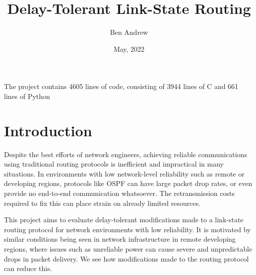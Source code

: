 \documentclass[withindex,glossary,openany]{cam-thesis}
\title{Delay-Tolerant Link-State Routing}
\author{Ben Andrew}
\date{May, 2022}
\begin{document}

\frontmatter{}



The project contains 4605 lines of code, consisting of 3944 lines of C and 661 lines of Python

\pagebreak

\chapter{Introduction}



Despite the best efforts of network engineers, achieving reliable communications using traditional routing protocols is inefficient and impractical in many situations. In environments with low network-level reliability such as remote or developing regions, protocols like OSPF can have large packet drop rates, or even provide no end-to-end communication whatsoever. The retransmission costs required to fix this can place strain on already limited resources.

This project aims to evaluate delay-tolerant modifications made to a link-state routing protocol for network environments with low reliability. It is motivated by similar conditions being seen in network infrastructure in remote developing regions, where issues such as unreliable power can cause severe and unpredictable drops in packet delivery. We see how modifications made to the routing protocol can reduce this.



\end{document}
